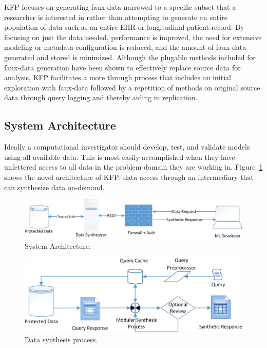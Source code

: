 \documentclass{amia}
\begin{document}
KFP focuses on generating faux-data narrowed to a specific subset that a researcher is interested in rather than attempting to generate an entire population of data such as an entire EHR or longitudinal patient record. By focusing on just the data needed, performance is improved, the need for extensive modeling or metadata configuration is reduced, and the amount of faux-data generated and stored is minimized. Although the plugable methods included for faux-data generation have been shown to effectively replace source data for analysis, KFP facilitates a more through process that includes an initial exploration with faux-data followed by a repetition of methods on original source data through query logging and thereby aiding in replication.

\subsection{System Architecture}

Ideally a computational investigator should develop, test, and validate models using all available data. This is most easily accomplished when they have unfettered access to all data in the problem domain they are working in. Figure~\ref{fig:architecture} shows the novel architecture of KFP: data access through an intermediary that can synthesize data on-demand.

\begin{figure}[ht]
  \centering
  \includegraphics[width=\textwidth]{prototype_architecture}
  \caption{System Architecture.}
  \label{fig:architecture}
\end{figure}
\begin{figure}[ht]
  \centering
  \includegraphics[width=120mm]{data_synthesis_process}
  \caption{Data synthesis process.}
  \label{fig:synthesis_process}
\end{figure}
\end{document}
